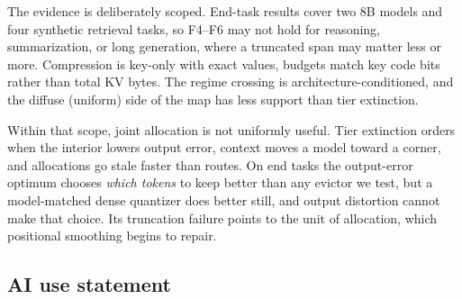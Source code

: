 \documentclass{article}
\newif\ifshowest \showesttrue
\DeclareRobustCommand{\estonly}[1]{\ifshowest#1\else\ifhmode\unskip\fi\fi}
\theoremstyle{definition}
\begin{document}
The evidence is deliberately scoped.  
End-task results cover two 8B models and four synthetic retrieval tasks, 
so F4--F6 may not hold for reasoning, summarization, or long generation, where a truncated span may matter less or more.  
Compression is key-only with exact values, budgets match key code bits rather than total KV bytes. %
The regime crossing is architecture-conditioned, and the diffuse (uniform) side of the map has less support than tier extinction.

Within that scope, joint allocation is not uniformly useful.  Tier extinction orders when the interior lowers output error, context moves a model toward a corner, and allocations go stale faster than routes.  
On end tasks the output-error optimum chooses \emph{which tokens} to keep better than any evictor we test, but a model-matched dense quantizer does better still, and output distortion cannot make that choice.  
Its truncation failure points to the unit of allocation, which positional smoothing begins to repair.

\label{main:end}

\subsection*{AI use statement}
\end{document}
